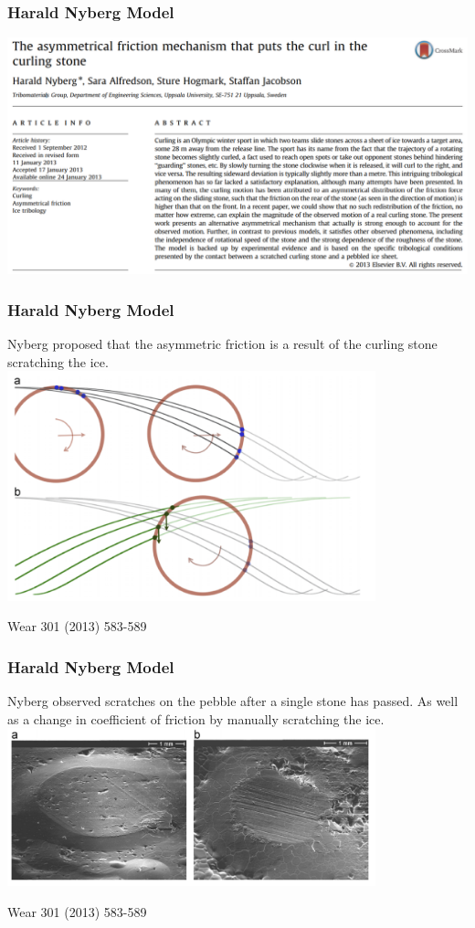 \documentclass{beamer}
\begin{document}
\begin{frame}\frametitle{Harald Nyberg Model}
    \centering
    \includegraphics[width=1.0\textwidth]{Images/Nyberg_Title.png}
\end{frame}

\begin{frame}\frametitle{Harald Nyberg Model}
    Nyberg proposed that the asymmetric friction is a result of the curling stone scratching the ice.
    \centering
    \includegraphics[width=0.8\textwidth]{Images/Scratch_Fig.png}

    \scriptsize{Wear 301 (2013) 583-589}
\end{frame}

\begin{frame}\frametitle{Harald Nyberg Model}
    Nyberg observed scratches on the pebble after a single stone has passed. As well as a change in coefficient of friction by manually scratching the ice.
    \centering
    \includegraphics[width=0.8\textwidth]{Images/Scratch_SEM.png}

    \scriptsize{Wear 301 (2013) 583-589}
\end{frame}
\end{document}
